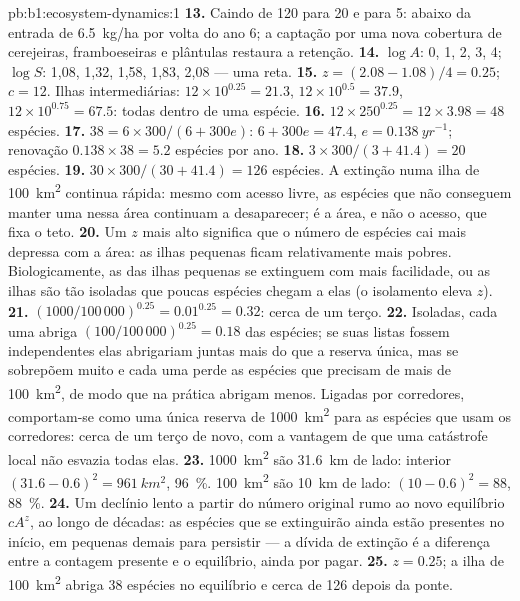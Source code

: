 \begin{solution}{pb:b1:ecosystem-dynamics:1}
\textbf{13.} Caindo de \num{120} para \num{20} e para \num{5}: abaixo
da entrada de \qty{6.5}{kg/ha} por volta do ano 6; a captação por uma
nova cobertura de cerejeiras, framboeseiras e plântulas restaura a
retenção.
\textbf{14.} $\log A$: 0, 1, 2, 3, 4; $\log S$: 1,08, 1,32, 1,58,
1,83, 2,08 --- uma reta.
\textbf{15.} $z = (2.08 - 1.08)/4 = 0.25$; $c = 12$. Ilhas
intermediárias: $12\times 10^{0.25} = 21.3$, $12\times 10^{0.5} = 37.9$, $12\times
10^{0.75} = 67.5$: todas dentro de uma espécie.
\textbf{16.} $12\times 250^{0.25} = 12\times 3.98 = 48$ espécies.
\textbf{17.} $38 = 6\times 300/(6 + 300e)$: $6 + 300e = 47.4$, $e =
\qty{0.138}{yr^{-1}}$; renovação $0.138\times 38 = 5.2$ espécies por ano.
\textbf{18.} $3\times 300/(3 + 41.4) = 20$ espécies.
\textbf{19.} $30\times 300/(30 + 41.4) = 126$ espécies. A extinção numa
ilha de \qty{100}{km^2} continua rápida: mesmo com acesso livre, as
espécies que não conseguem manter uma  nessa área continuam a
desaparecer; é a área, e não o acesso, que fixa o teto.
\textbf{20.} Um $z$ mais alto significa que o número de espécies cai
mais depressa com a área: as ilhas pequenas ficam relativamente mais
pobres. Biologicamente, as  das ilhas pequenas se extinguem
com mais facilidade, ou as ilhas são tão isoladas que poucas espécies
chegam a elas (o isolamento eleva $z$).
\textbf{21.} $(1000/100\,000)^{0.25} = 0.01^{0.25} = 0.32$: cerca de um
terço.
\textbf{22.} Isoladas, cada uma abriga $(100/100\,000)^{0.25} = 0.18$
das espécies; se suas listas fossem independentes elas abrigariam
juntas mais do que a reserva única, mas se sobrepõem muito e cada uma
perde as espécies que precisam de mais de \qty{100}{km^2}, de modo que
na prática abrigam menos. Ligadas por corredores, comportam-se como
uma única reserva de \qty{1000}{km^2} para as espécies que usam os
corredores: cerca de um terço de novo, com a vantagem de que uma
catástrofe local não esvazia todas elas.
\textbf{23.} \qty{1000}{km^2} são \qty{31.6}{km} de lado: interior
$(31.6 - 0.6)^2 = \qty{961}{km^2}$, \qty{96}{\%}. \qty{100}{km^2} são
\qty{10}{km} de lado: $(10 - 0.6)^2 = 88$, \qty{88}{\%}.
\textbf{24.} Um declínio lento a partir do número original rumo ao novo
equilíbrio $cA^z$, ao longo de décadas: as espécies que se extinguirão
ainda estão presentes no início, em  pequenas demais para
persistir --- a dívida de extinção é a diferença entre a contagem
presente e o equilíbrio, ainda por pagar.
\textbf{25.} $z = 0.25$; a ilha de \qty{100}{km^2} abriga \num{38}
espécies no equilíbrio e cerca de \num{126} depois da ponte.
\end{solution}
